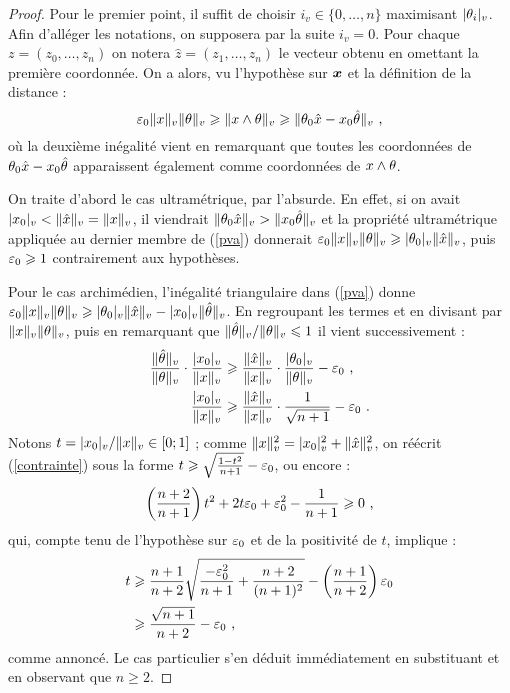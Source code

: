 \documentclass{mpg-preth}
\begin{document}
\begin{proof}
  Pour le premier point, il suffit de choisir $i_v \in \{ 0, \dots, n\}$
  maximisant $\lvert\theta_i\rvert_{v}$. Afin d'alléger les notations, on supposera par la
  suite $i_v = 0$. Pour chaque $z = (z_0, \dots, z_n)$ on notera $\hat{z} =
  (z_1, \dots, z_n)$ le vecteur obtenu en omettant la première coordonnée. On
  a alors, vu l'hypothèse sur ${\boldsymbol{x}}$ et la définition de la distance :
  \begin{equation}
  \varepsilon_0 \lVert x\rVert_{v}\lVert\theta\rVert_{v}  \geqslant \lVert x \wedge \theta\rVert_{v} \geqslant \lVert\theta_0 \hat{x} -
    x_0 \hat{\theta}\rVert_{v} \text{ ,} \label{pva}
  \end{equation}
  où la deuxième inégalité vient en remarquant que toutes les coordonnées de
  $\theta_0 \hat{x} - x_0 \hat{\theta}$ apparaissent également comme coordonnées
  de $x \wedge \theta$.

  On traite d'abord le cas ultramétrique, par l'absurde. En effet, si on avait
  $\lvert x_0\rvert_{v}< \lVert\hat{x}\rVert_{v} = \lVert x\rVert_{v}$, il viendrait $\lVert\theta_0 \hat{x}\rVert_{v} >
  \lVert x_0 \hat{\theta}\rVert_{v}$ et la propriété ultramétrique appliquée au dernier
  membre de (\ref{pva}) donnerait $\varepsilon_0 \lVert x\rVert_{v}\lVert\theta\rVert_{v}  \geqslant
  \lvert\theta_0\rvert_{v}\lVert\hat{x}\rVert_{v}$, puis $\varepsilon_0 \geqslant 1$ contrairement aux hypothèses.

  Pour le cas archimédien, l'inégalité triangulaire dans (\ref{pva}) donne
  $\varepsilon_0 \lVert x\rVert_{v}\lVert\theta\rVert_{v}  \geqslant \lvert\theta_0\rvert_{v}\lVert\hat{x}\rVert_{v} -
  \lvert x_0\rvert_{v}\lVert\hat{\theta}\rVert_{v} $. En regroupant les termes et en divisant par
  $\lVert x\rVert_{v}\lVert\theta\rVert_{v}$, puis en remarquant que $\lVert\hat{\theta}\rVert_{v}/\lVert\theta\rVert_{v} \leqslant
  1$ il vient successivement :
  \begin{align}
  \frac{\lVert\hat{\theta}\rVert_{v}}{\lVert\theta\rVert_{v}} \cdot \frac{\lvert x_0\rvert_{v}}{\lVert x\rVert_{v}}
  & \geqslant \frac{\lVert\hat{x}\rVert_{v}}{\lVert x\rVert_{v}}\cdot \frac{\lvert\theta_0\rvert_{v}}{\lVert\theta\rVert_{v}} -
  \varepsilon_0 \text{ ,} \notag \\
  \frac{\lvert x_0\rvert_{v}}{\lVert x\rVert_{v}} & \geqslant
  \frac{\lVert\hat{x}\rVert_{v}}{\lVert x\rVert_{v}}\cdot\frac{1}{\sqrt{n+1}} - \varepsilon_0 \text{ .}
  \label{contrainte}
  \end{align}
  Notons $t = \lvert x_0\rvert_{v}/\lVert x\rVert_{v} \in [0; 1]$ ; comme $\lVert x\rVert_{v}^2 = \lvert x_0\rvert_{v}^2 +
  \lVert\hat{x}\rVert_{v}^2$, on réécrit (\ref{contrainte}) sous la forme $t \geqslant
  \sqrt{\frac{1-t^2}{n+1}}-\varepsilon_0$, ou encore :
  \[
  \left(\frac{n+2}{n+1}\right)t^2 + 2t\varepsilon_0 + \varepsilon_0^2 - \frac{1}{n+1} \geqslant
  0 \text{ ,}
  \]
  qui, compte tenu de l'hypothèse sur $\varepsilon_0$ et de la positivité de $t$,
  implique :
  \begin{align*}
  t & \geqslant \frac{n+1}{n+2}\sqrt{\frac{-\varepsilon_0^2}{n+1}+\frac{n+2}{(n+1)^2}} -
  \left(\frac{n+1}{n+2}\right)\varepsilon_0\\
  & \geqslant \frac{\sqrt{n+1}}{n+2} - \varepsilon_0 \text{ ,}
  \end{align*}
  comme annoncé. Le cas particulier s'en déduit immédiatement en substituant
  et en observant que $n \ge 2$.
\end{proof}
\end{document}
